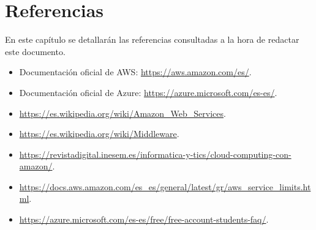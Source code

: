 \chapter{Referencias}
En este capítulo se detallarán las referencias consultadas a la hora de redactar este documento.
\begin{itemize}
	\item Documentación oficial de AWS: \url{https://aws.amazon.com/es/}.
	\item Documentación oficial de Azure: \url{https://azure.microsoft.com/es-es/}.
	\item \url{https://es.wikipedia.org/wiki/Amazon_Web_Services}.
	\item \url{https://es.wikipedia.org/wiki/Middleware}.
	\item \url{https://revistadigital.inesem.es/informatica-y-tics/cloud-computing-con-amazon/}.
	\item \url{https://docs.aws.amazon.com/es_es/general/latest/gr/aws_service_limits.html}.
	\item \url{https://azure.microsoft.com/es-es/free/free-account-students-faq/}.
\end{itemize}